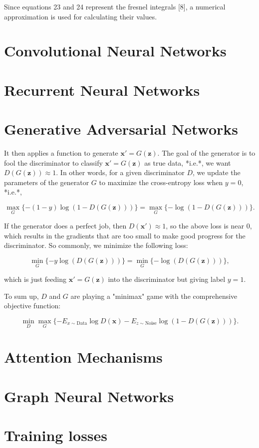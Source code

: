 Since equations 23 and 24 represent the fresnel integrals [8], a numerical approximation is used for calculating their values.

\section{Convolutional Neural Networks}
\label{sec:3_cnns}

\section{Recurrent Neural Networks}
\label{sec:3_rnns}

\section{Generative Adversarial Networks}
\label{sec:3_gans}

It then applies a function to generate $\mathbf x'=G(\mathbf z)$. The goal of the generator is to fool the discriminator to classify $\mathbf x'=G(\mathbf z)$ as true data, *i.e.*, we want $D( G(\mathbf z)) \approx 1$.
In other words, for a given discriminator $D$, we update the parameters of the generator $G$ to maximize the cross-entropy loss when $y=0$, *i.e.*,

$$ \max_G \{ - (1-y) \log(1-D(G(\mathbf z))) \} = \max_G \{ - \log(1-D(G(\mathbf z))) \}.$$

If the generator does a perfect job, then $D(\mathbf x')\approx 1$, so the above loss is near 0, which results in the gradients that are too small to make good progress for the discriminator. So commonly, we minimize the following loss:

$$ \min_G \{ - y \log(D(G(\mathbf z))) \} = \min_G \{ - \log(D(G(\mathbf z))) \}, $$

which is just feeding $\mathbf x'=G(\mathbf z)$ into the discriminator but giving label $y=1$.


To sum up, $D$ and $G$ are playing a "minimax" game with the comprehensive objective function:

$$\min_D \max_G \{ -E_{x \sim \text{Data}} \log D(\mathbf x) - E_{z \sim \text{Noise}} \log(1 - D(G(\mathbf z))) \}.$$

\section{Attention Mechanisms}
\label{sec:3_attention}

\section{Graph Neural Networks}
\label{sec:3_gnns}

\section{Training losses}
\label{sec:3_losses}